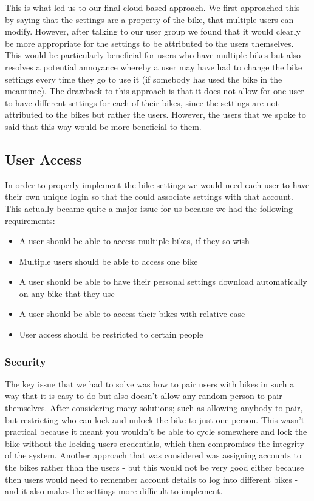 \documentclass[a4paper]{report}
\begin{document}
This is what led us to our final cloud based approach. We first approached this by saying that the settings are a property of the bike, that multiple users can modify. However, after talking to our user group we found that it would clearly be more appropriate for the settings to be attributed to the users themselves. This would be particularly beneficial for users who have multiple bikes but also resolves a potential annoyance whereby a user may have had to change the bike settings every time they go to use it (if somebody has used the bike in the meantime). The drawback to this approach is that it does not allow for one user to have different settings for each of their bikes, since the settings are not attributed to the bikes but rather the users. However, the users that we spoke to said that this way would be more beneficial to them.


\subsection{User Access}
In order to properly implement the bike settings we would need each user to have their own unique login so that the could associate settings with that account. This actually became quite a major issue for us because we had the following requirements:

\begin{itemize}
\item A user should be able to access multiple bikes, if they so wish
\item Multiple users should be able to access one bike
\item A user should be able to have their personal settings download automatically on any bike that they use
\item A user should be able to access their bikes with relative ease
\item User access should be restricted to certain people
\end{itemize}

\subsubsection{Security}
The key issue that we had to solve was how to pair users with bikes in such a way that it is easy to do but also doesn't allow any random person to pair themselves. After considering many solutions; such as allowing anybody to pair, but restricting who can lock and unlock the bike to just one person. This wasn't practical because it meant you wouldn't be able to cycle somewhere and lock the bike without the locking users credentials, which then compromises the integrity of the system. Another approach that was considered was assigning accounts to the bikes rather than the users - but this would not be very good either because then users would need to remember account details to log into different bikes - and it also makes the settings more difficult to implement.
\end{document}
